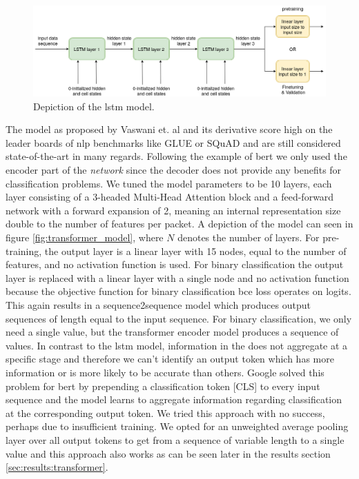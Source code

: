 \begin{figure}[h]
	\centering
	\includegraphics[width=0.95\linewidth]{graphics/img/lstm_model.png}
	\caption{Depiction of the \gls{lstm} model.}
	\label{fig:lstm_model}
\end{figure}

The  model as proposed by Vaswani et. al \cite{attention} and its derivative score high on the leader boards of \gls{nlp} benchmarks like GLUE \cite{glue} or SQuAD \cite{squad} and are still considered state-of-the-art in many regards. Following the example of \gls{bert} we only used the encoder part of the \textit{network} since the decoder does not provide any benefits for classification problems. We tuned the model parameters to be 10 layers, each layer consisting of a 3-headed Multi-Head Attention block and a feed-forward network with a forward expansion of 2, meaning an internal representation size double to the number of features per packet. A depiction of the model can seen in figure \ref{fig:transformer_model}, where $N$ denotes the number of layers. For pre-training, the output layer is a linear layer with 15 nodes, equal to the number of features, and no activation function is used. For binary classification the output layer is replaced with a linear layer with a single node and no activation function because the objective function for binary classification \gls{bce} loss operates on logits. This again results in a sequence2sequence model which produces output sequences of length equal to the input sequence. For binary classification, we only need a single value, but the transformer encoder model produces a sequence of values. In contrast to the \gls{lstm} model, information in the  does not aggregate at a specific stage and therefore we can't identify an output token which has more information or is more likely to be accurate than others. Google solved this problem for \gls{bert} by prepending a classification token [CLS] to every input sequence and the model learns to aggregate information regarding classification at the corresponding output token. We tried this approach with no success, perhaps due to insufficient training. We opted for an unweighted average pooling layer over all output tokens to get from a sequence of variable length to a single value and this approach also works as can be seen later in the results section \ref{sec:results:transformer}.

